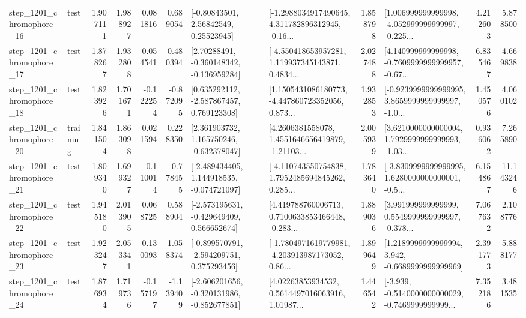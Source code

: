 \begin{tabular}{llrrrrllrlrr}
 step\_1201\_chromophore\_16 &      test &      1.907111 &    1.988927 &      0.081816 &  0.689054 &       [-0.80843501, 2.56842549, 0.25523945] &  [-1.2988034917490645, 4.311782896312945, -0.16... &       1.858798 &  [1.006999999999998, -4.052999999999997, -0.225... &            4.212603 &          5.878500 \\
 step\_1201\_chromophore\_17 &      test &      1.878267 &    1.932808 &      0.054541 &  0.480394 &    [2.70288491, -0.360148342, -0.136959284] &  [-4.550418653957281, 1.119937345143871, 0.4834... &       2.027488 &  [4.140999999999998, -0.7609999999999957, -0.67... &            6.835467 &          4.669838 \\
 step\_1201\_chromophore\_18 &      test &      1.823926 &    1.701671 &     -0.122254 & -0.872095 &    [0.635292112, -2.587867457, 0.769123308] &  [1.1505431086180773, -4.447860723352056, 0.873... &       1.932853 &  [-0.9239999999999995, 3.8659999999999997, -1.0... &            1.450576 &          4.060102 \\
 step\_1201\_chromophore\_20 &  training &      1.841504 &    1.863098 &      0.021594 &  0.228350 &    [2.361903732, 1.165750246, -0.632378047] &  [4.2606381558078, 1.4551646656419879, -1.21103... &       2.005939 &  [3.6210000000000004, 1.7929999999999993, -1.03... &            0.936062 &          7.265890 \\
 step\_1201\_chromophore\_21 &      test &      1.809340 &    1.699327 &     -0.110014 & -0.778455 &   [-2.489434405, 1.144918535, -0.074721097] &  [-4.110743550754838, 1.7952485694845262, 0.285... &       1.783640 &  [-3.8309999999999995, 1.6280000000000001, -0.5... &            6.154867 &         11.143246 \\
 step\_1201\_chromophore\_22 &      test &      1.945180 &    2.013905 &      0.068725 &  0.588904 &   [-2.573195631, -0.429649409, 0.566652674] &  [4.419788760006713, 0.7100633853466448, -0.283... &       1.889036 &  [3.991999999999999, 0.5549999999999997, -0.378... &            7.067632 &          2.108776 \\
 step\_1201\_chromophore\_23 &      test &      1.923247 &    2.053341 &      0.130093 &  1.058374 &   [-0.899570791, -2.594209751, 0.375293456] &  [-1.7804971619779981, -4.203913987173052, 0.86... &       1.899649 &   [1.2189999999999994, 3.942, -0.6689999999999969] &            2.391773 &          5.888177 \\
 step\_1201\_chromophore\_24 &      test &      1.876934 &    1.719736 &     -0.157197 & -1.139409 &  [-2.606201656, -0.320131986, -0.852677851] &  [4.02263853934532, 0.5614497016063916, 1.01987... &       1.446542 &  [-3.939, -0.5140000000000029, -0.7469999999999... &            7.352186 &          3.481535 \\

\end{tabular}
